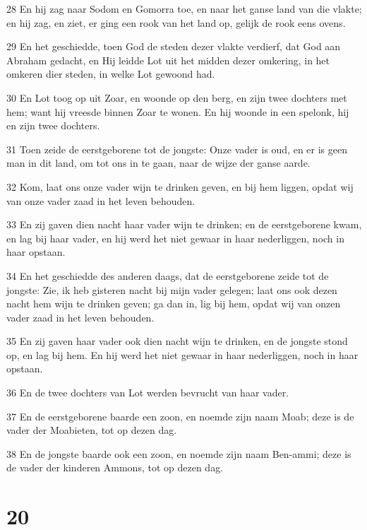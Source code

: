 \par 28 En hij zag naar Sodom en Gomorra toe, en naar het ganse land van die vlakte; en hij zag, en ziet, er ging een rook van het land op, gelijk de rook eens ovens.
\par 29 En het geschiedde, toen God de steden dezer vlakte verdierf, dat God aan Abraham gedacht, en Hij leidde Lot uit het midden dezer omkering, in het omkeren dier steden, in welke Lot gewoond had.
\par 30 En Lot toog op uit Zoar, en woonde op den berg, en zijn twee dochters met hem; want hij vreesde binnen Zoar te wonen. En hij woonde in een spelonk, hij en zijn twee dochters.
\par 31 Toen zeide de eerstgeborene tot de jongste: Onze vader is oud, en er is geen man in dit land, om tot ons in te gaan, naar de wijze der ganse aarde.
\par 32 Kom, laat ons onze vader wijn te drinken geven, en bij hem liggen, opdat wij van onze vader zaad in het leven behouden.
\par 33 En zij gaven dien nacht haar vader wijn te drinken; en de eerstgeborene kwam, en lag bij haar vader, en hij werd het niet gewaar in haar nederliggen, noch in haar opstaan.
\par 34 En het geschiedde des anderen daags, dat de eerstgeborene zeide tot de jongste: Zie, ik heb gisteren nacht bij mijn vader gelegen; laat ons ook dezen nacht hem wijn te drinken geven; ga dan in, lig bij hem, opdat wij van onzen vader zaad in het leven behouden.
\par 35 En zij gaven haar vader ook dien nacht wijn te drinken, en de jongste stond op, en lag bij hem. En hij werd het niet gewaar in haar nederliggen, noch in haar opstaan.
\par 36 En de twee dochters van Lot werden bevrucht van haar vader.
\par 37 En de eerstgeborene baarde een zoon, en noemde zijn naam Moab; deze is de vader der Moabieten, tot op dezen dag.
\par 38 En de jongste baarde ook een zoon, en noemde zijn naam Ben-ammi; deze is de vader der kinderen Ammons, tot op dezen dag.

\chapter{20}

